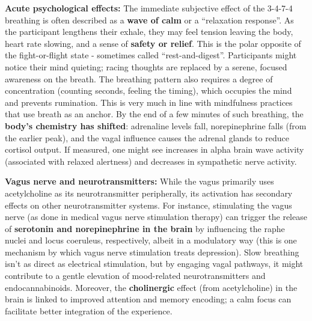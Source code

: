 \documentclass[11pt]{article}
\newcommand{\quotes}[1]{``#1''}
\begin{document}
\textbf{Acute psychological effects:} The immediate subjective effect of the 3-4-7-4 breathing is often described as a \textbf{wave of calm} or a \quotes{relaxation response}. As the participant lengthens their exhale, they may feel tension leaving the body, heart rate slowing, and a sense of \textbf{safety or relief}. This is the polar opposite of the fight-or-flight state - sometimes called \quotes{rest-and-digest}. Participants might notice their mind quieting; racing thoughts are replaced by a serene, focused awareness on the breath. The breathing pattern also requires a degree of concentration (counting seconds, feeling the timing), which occupies the mind and prevents rumination. This is very much in line with mindfulness practices that use breath as an anchor. By the end of a few minutes of such breathing, the \textbf{body's chemistry has shifted}: adrenaline levels fall, norepinephrine falls (from the earlier peak), and the vagal influence causes the adrenal glands to reduce cortisol output. If measured, one might see increases in alpha brain wave activity (associated with relaxed alertness) and decreases in sympathetic nerve activity.

\textbf{Vagus nerve and neurotransmitters:} While the vagus primarily uses acetylcholine as its neurotransmitter peripherally, its activation has secondary effects on other neurotransmitter systems. For instance, stimulating the vagus nerve (as done in medical vagus nerve stimulation therapy) can trigger the release of \textbf{serotonin and norepinephrine in the brain} by influencing the raphe nuclei and locus coeruleus, respectively, albeit in a modulatory way (this is one mechanism by which vagus nerve stimulation treats depression). Slow breathing isn't as direct as electrical stimulation, but by engaging vagal pathways, it might contribute to a gentle elevation of mood-related neurotransmitters and endocannabinoids. Moreover, the \textbf{cholinergic} effect (from acetylcholine) in the brain is linked to improved attention and memory encoding; a calm focus can facilitate better integration of the experience.
\end{document}
